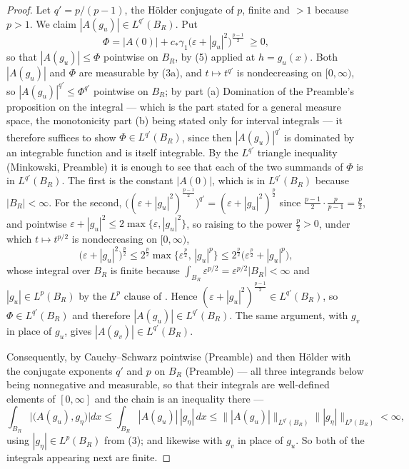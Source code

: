 \begin{proof}
Let $q'=p/(p-1)$, the H\"older conjugate of $p$, finite and $>1$ because
$p>1$.  We claim $|A(g_u)|\in L^{q'}(B_R)$.  Put
\[
\Phi=|A(0)|+c_\ast\gamma_1\bigl(\varepsilon+|g_u|^2\bigr)^{\frac{p-1}2}\ \ge 0 ,
\]
so that $|A(g_u)|\le\Phi$ pointwise on $B_R$, by (5) applied at
$h=g_u(x)$.  Both $|A(g_u)|$ and $\Phi$ are measurable by (3a), and
$t\mapsto t^{q'}$ is nondecreasing on $[0,\infty)$, so
$|A(g_u)|^{q'}\le\Phi^{q'}$ pointwise on $B_R$; by part (a) Domination of the
Preamble's proposition on the integral --- which is the part stated for a general
measure space, the monotonicity part (b) being stated only for interval
integrals --- it therefore suffices to show $\Phi\in L^{q'}(B_R)$, since then
$|A(g_u)|^{q'}$ is dominated by an integrable function and is itself
integrable.  By the $L^{q'}$ triangle
inequality (Minkowski, Preamble) it is enough to see that each of the two
summands of $\Phi$ is in $L^{q'}(B_R)$.  The first is
the constant $|A(0)|$, which is in $L^{q'}(B_R)$ because $|B_R|<\infty$.  For
the second, $\bigl((\varepsilon+|g_u|^2)^{\frac{p-1}2}\bigr)^{q'}
=(\varepsilon+|g_u|^2)^{\frac p2}$ since $\frac{p-1}2\cdot\frac p{p-1}
=\frac p2$, and pointwise
$\varepsilon+|g_u|^2\le2\max\{\varepsilon,|g_u|^2\}$, so raising to the power
$\frac p2>0$, under which $t\mapsto t^{p/2}$ is nondecreasing on $[0,\infty)$,
\[
\bigl(\varepsilon+|g_u|^2\bigr)^{\frac p2}
\le 2^{\frac p2}\max\bigl\{\varepsilon^{\frac p2},\,|g_u|^{p}\bigr\}
\le 2^{\frac p2}\bigl(\varepsilon^{\frac p2}+|g_u|^{p}\bigr),
\]
whose integral over $B_R$ is finite because
$\int_{B_R}\varepsilon^{p/2}=\varepsilon^{p/2}|B_R|<\infty$ and
$|g_u|\in L^p(B_R)$ by the $L^p$ clause of .  Hence
$(\varepsilon+|g_u|^2)^{\frac{p-1}2}\in L^{q'}(B_R)$, so
$\Phi\in L^{q'}(B_R)$ and therefore
$|A(g_u)|\in L^{q'}(B_R)$.  The same argument, with $g_v$ in place of $g_u$,
gives $|A(g_v)|\in L^{q'}(B_R)$.

Consequently, by Cauchy--Schwarz pointwise (Preamble) and then H\"older with the
conjugate exponents $q'$ and $p$ on $B_R$ (Preamble) --- all three integrands
below being nonnegative and measurable, so that their integrals are well-defined
elements of $[0,\infty]$ and the chain is an inequality there ---
\[
\int_{B_R}\bigl|\bigl(A(g_u),g_\eta\bigr)\bigr|dx
\le\int_{B_R}|A(g_u)|\,|g_\eta|\,dx
\le\bigl\||A(g_u)|\bigr\|_{L^{q'}(B_R)}\bigl\||g_\eta|\bigr\|_{L^{p}(B_R)}<\infty ,
\]
using $|g_\eta|\in L^p(B_R)$ from (3); and likewise with $g_v$ in place of
$g_u$.  So both of the integrals appearing next are finite.


\end{proof}
